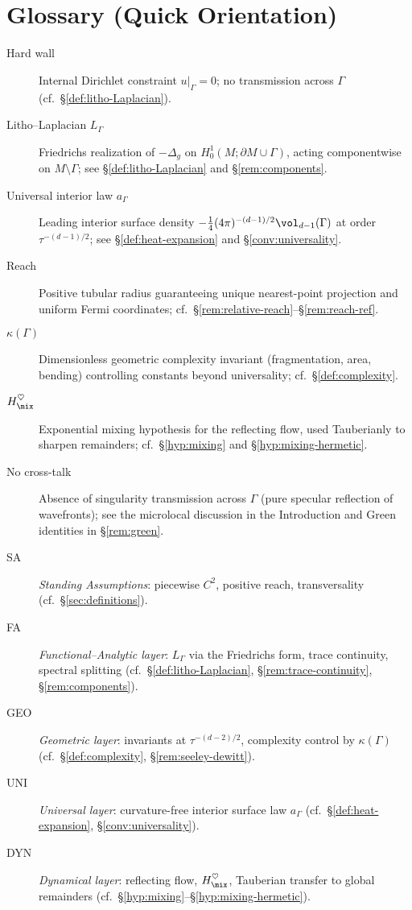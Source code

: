 \section{Glossary (Quick Orientation)}\label{sec:glossary}
\begin{description}
  \item[Hard wall] Internal Dirichlet constraint $u|_{\Gamma}=0$; no transmission across $\Gamma$ (cf.\ \S\ref{def:litho-Laplacian}).
  \item[Litho–Laplacian $L_\Gamma$] Friedrichs realization of $-\Delta_g$ on $H^1_0(M;\partial M\cup\Gamma)$, acting componentwise on $M\setminus\Gamma$; see \S\ref{def:litho-Laplacian} and \S\ref{rem:components}.
  \item[Universal interior law $a_\Gamma$] Leading interior surface density
  $-\tfrac14(4\pi)^{-(d-1)/2}\vol_{d-1}(\Gamma)$ at order $\tau^{-(d-1)/2}$; see \S\ref{def:heat-expansion} and \S\ref{conv:universality}.
  \item[Reach] Positive tubular radius guaranteeing unique nearest-point projection and uniform Fermi coordinates; cf.\ \S\ref{rem:relative-reach}–\S\ref{rem:reach-ref}.
  \item[$\kappa(\Gamma)$] Dimensionless geometric complexity invariant (fragmentation, area, bending) controlling constants beyond universality; cf.\ \S\ref{def:complexity}.
  \item[$H_{\mix}^{\heartsuit}$] Exponential mixing hypothesis for the reflecting flow, used Tauberi\-anly to sharpen remainders; cf.\ \S\ref{hyp:mixing} and \S\ref{hyp:mixing-hermetic}.
  \item[No cross-talk] Absence of singularity transmission across $\Gamma$ (pure specular reflection of wavefronts); see the microlocal discussion in the Introduction and Green identities in \S\ref{rem:green}.
  \item[SA] \emph{Standing Assumptions}: piecewise $C^2$, positive reach, transversality (cf.\ \S\ref{sec:definitions}).
  \item[FA] \emph{Functional–Analytic layer}: $L_\Gamma$ via the Friedrichs form, trace continuity, spectral splitting (cf.\ \S\ref{def:litho-Laplacian}, \S\ref{rem:trace-continuity}, \S\ref{rem:components}).
  \item[GEO] \emph{Geometric layer}: invariants at $\tau^{-(d-2)/2}$, complexity control by $\kappa(\Gamma)$ (cf.\ \S\ref{def:complexity}, \S\ref{rem:seeley-dewitt}).
  \item[UNI] \emph{Universal layer}: curvature-free interior surface law $a_\Gamma$ (cf.\ \S\ref{def:heat-expansion}, \S\ref{conv:universality}).
  \item[DYN] \emph{Dynamical layer}: reflecting flow, $H_{\mix}^{\heartsuit}$, Tauberian transfer to global remainders (cf.\ \S\ref{hyp:mixing}–\S\ref{hyp:mixing-hermetic}).
\end{description}


